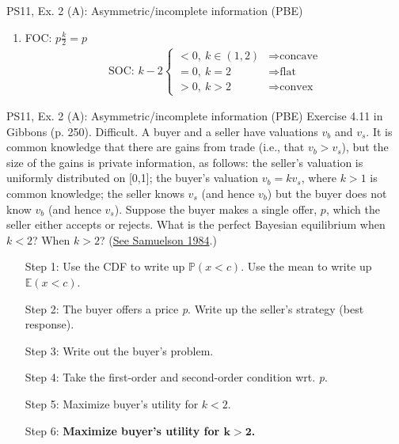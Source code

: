 \begin{frame}{PS11, Ex. 2 (A): Asymmetric/incomplete information (PBE)}
\begin{multicols}{2}
\begin{enumerate}
        \item FOC: $p\frac{k}{2}=p$\vspace{-6pt}
        \begin{align*}
          \text{SOC: }k-2\left\{\begin{array}{ll}
              <0,\ k\in(1,2)&\Rightarrow\text{concave}\\
              =0,\ k=2&\Rightarrow\text{flat}\\
              >0,\ k>2&\Rightarrow\text{convex}
          \end{array}\right.
        \end{align*}
      \end{enumerate}
      \vfill\null
    \end{multicols}
\end{frame}
\begin{frame}{PS11, Ex. 2 (A): Asymmetric/incomplete information (PBE)}
    Exercise 4.11 in Gibbons (p. 250). Difficult. A buyer and a seller have valuations $v_b$ and $v_s$. It is common knowledge that there are gains from trade (i.e., that $v_b > v_s$), but the size of the gains is private information, as follows: the seller’s valuation is uniformly distributed on [0,1]; the buyer’s valuation $v_b = kv_s$, where $k > 1$ is common knowledge; the seller knows $v_s$ (and hence $v_b$) but the buyer does not know $v_b$ (and hence $v_s$). Suppose the buyer makes a single offer, $p$, which the seller either accepts or rejects. What is the perfect Bayesian equilibrium when $k < 2$? When $k > 2$? (\href{https://www.jstor.org/stable/1911195}{See Samuelson 1984}.) \vspace{-8pt}
    \begin{multicols}{2}
      \begin{itemize}
        \item[Step 1:] Use the CDF to write up $\mathbb{P}(x<c)$. Use the mean to write up $\mathbb{E}(x<c)$.
        \item[Step 2:] The buyer offers a price \textit{p}. Write up the seller's strategy (best response).
        \item[Step 3:] Write out the buyer's problem.
        \item[Step 4:] Take the first-order and second-order condition wrt. \textit{p}.
        \item[Step 5:] Maximize buyer's utility for $k<2$.
        \item[Step 6:] \textbf{Maximize buyer's utility for $\bm{k>2}$.}
      \end{itemize}

\end{multicols}
\end{frame}
